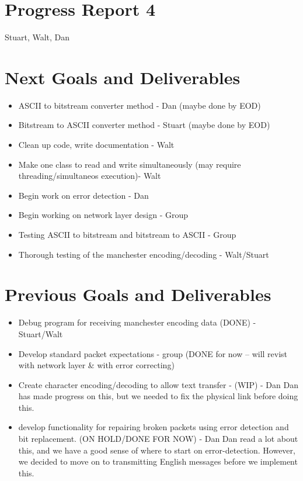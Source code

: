 \documentclass{article}
\begin{document}
\section*{Progress Report 4}
Stuart, Walt, Dan

\section*{Next Goals and Deliverables}
\begin{itemize}
\item ASCII to bitstream converter method - Dan (maybe done by EOD)
\item Bitstream to ASCII converter method - Stuart (maybe done by EOD)
\item Clean up code, write documentation - Walt
\item Make one class to read and write simultaneously (may require threading/simultaneos execution)- Walt 
\item Begin work on error detection - Dan
\item Begin working on network layer design - Group
\item Testing ASCII to bitstream and bitstream to ASCII - Group
\item Thorough testing of the manchester encoding/decoding - Walt/Stuart
\end{itemize}

\section*{Previous Goals and Deliverables}
\begin{itemize}
    \item Debug program for receiving manchester encoding data (DONE) - Stuart/Walt
    \item Develop standard packet expectations - group (DONE for now -- will revist with network layer & with error correcting)
    \item Create character encoding/decoding to allow text transfer - (WIP) - Dan
        \subitem  Dan has made progress on this, but we needed to fix the physical link before doing this.
    \item develop functionality for repairing broken packets using error detection and bit replacement. (ON HOLD/DONE FOR NOW) - Dan
        \subitem Dan read a lot about this, and we have a good sense of where to start on error-detection. 
        However, we decided to move on to transmitting English messages before we implement this. 
\end{itemize}
\end{document}
